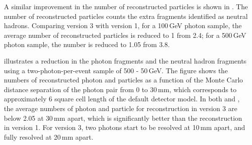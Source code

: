 A similar  improvement in the number of reconstructed particles is shown in . The number of  reconstructed particles counts the extra fragments identified as neutral hadrons.  Comparing \pandora version 3 with version 1, for a 100\,GeV photon sample, the average number of reconstructed particles is reduced to 1 from 2.4; for a 500\,GeV photon sample, the number is reduced to 1.05 from 3.8.


 illustrates a reduction in the photon fragments and the neutral hadron fragments using a two-photon-per-event sample of 500 - 50\,GeV. The figure shows the numbers of reconstructed photon and particles as a function of  the Monte Carlo distance separation of the photon pair from 0 to 30\,mm, which corresponds to approximately 6 \ECAL square cell length of the default \ILD detector model.  In both  and , the average numbers of photon and particle for reconstruction in \pandora version 3 are below 2.05 at 30\,mm apart, which is significantly better than the reconstruction in \pandora version 1. For \pandora version 3, two photons start to be resolved at 10\,mm apart, and fully resolved at 20\,mm apart.


